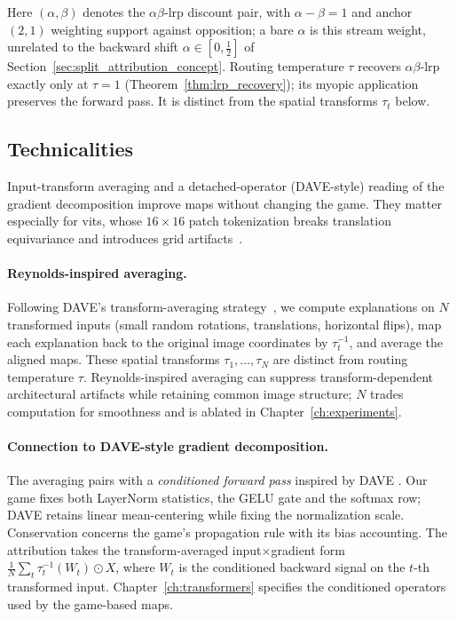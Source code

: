 Here $(\alpha,\beta)$ denotes the $\alpha\beta$-\ac{lrp} discount pair, with $\alpha-\beta=1$ and anchor $(2,1)$ weighting support against opposition; a bare $\alpha$ is this stream weight, unrelated to the backward shift $\alpha\in[0,\tfrac12]$ of Section~\ref{sec:split_attribution_concept}. Routing temperature $\tau$ recovers $\alpha\beta$-\ac{lrp} exactly only at $\tau=1$ (Theorem~\ref{thm:lrp_recovery}); its myopic application preserves the forward pass. It is distinct from the spatial transforms $\tau_t$ below.

\subsection{Technicalities}\label{subsec:technicalities}

Input-transform averaging and a detached-operator (DAVE-style) reading of the gradient decomposition improve maps without changing the game. They matter especially for \acp{vit}, whose $16\times16$ patch tokenization breaks translation equivariance and introduces grid artifacts~\parencite{Wrobel2024,Dosovitskiy2021vit}.

\paragraph{Reynolds-inspired averaging.} Following DAVE's transform-averaging strategy~\parencite{Wrobel2024}, we compute explanations on $N$ transformed inputs (small random rotations, translations, horizontal flips), map each explanation back to the original image coordinates by $\tau_t^{-1}$, and average the aligned maps. These spatial transforms $\tau_1,\dots,\tau_N$ are distinct from routing temperature $\tau$. Reynolds-inspired averaging can suppress transform-dependent architectural artifacts while retaining common image structure; $N$ trades computation for smoothness and is ablated in Chapter~\ref{ch:experiments}.

\paragraph{Connection to DAVE-style gradient decomposition.} The averaging pairs with a \emph{conditioned forward pass} inspired by DAVE \parencite{Wrobel2024}. Our game fixes both LayerNorm statistics, the GELU gate and the softmax row; DAVE retains linear mean-centering while fixing the normalization scale. Conservation concerns the game's propagation rule with its bias accounting. The attribution takes the transform-averaged input$\times$gradient form $\tfrac{1}{N}\sum_t \tau_t^{-1}(W_t) \odot X$, where $W_t$ is the conditioned backward signal on the $t$-th transformed input. Chapter~\ref{ch:transformers} specifies the conditioned operators used by the game-based maps.
